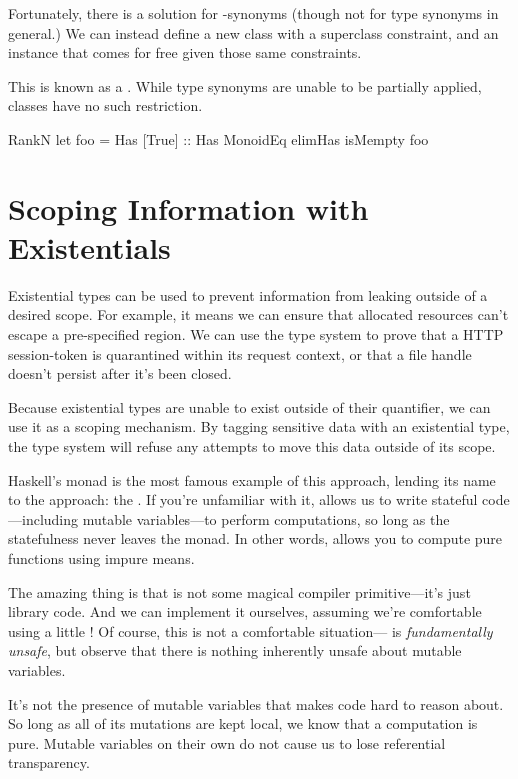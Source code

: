 \documentclass[book.tex]{subfiles}
\begin{document}
Fortunately, there is a solution for -synonyms (though not for
type synonyms in general.) We can instead define a new class with a superclass
constraint, and an instance that comes for free given those same constraints.


This is known as a . While type synonyms are unable to
be partially applied, classes have no such restriction.

\begin{dorepl}{RankN}
let foo = Has [True] :: Has MonoidEq
elimHas isMempty foo
\end{dorepl}


\section{Scoping Information with Existentials}


Existential types can be used to prevent information from leaking outside of a
desired scope. For example, it means we can ensure that allocated resources
can't escape a pre-specified region. We can use the type system to prove that a
HTTP session-token is quarantined within its request context, or that a file
handle doesn't persist after it's been closed.

Because existential types are unable to exist outside of their quantifier, we
can use it as a scoping mechanism. By tagging sensitive data with an existential
type, the type system will refuse any attempts to move this data outside of its
scope.

Haskell's  monad is the most famous example of this approach, lending its
name to the approach: the . If you're unfamiliar with it, 
allows us to write stateful code---including mutable variables---to perform
computations, so long as the statefulness never leaves the monad. In other
words,  allows you to compute pure functions using impure means.

The amazing thing is that  is not some magical compiler primitive---it's
just library code. And we can implement it ourselves, assuming we're comfortable
using a little ! Of course, this is not a comfortable
situation--- is \emph{fundamentally unsafe}, but observe
that there is nothing inherently unsafe about mutable variables.

It's not the presence of mutable variables that makes code hard to reason about.
So long as all of its mutations are kept local, we know that a computation is
pure. Mutable variables on their own do not cause us to lose referential
transparency.
\end{document}
